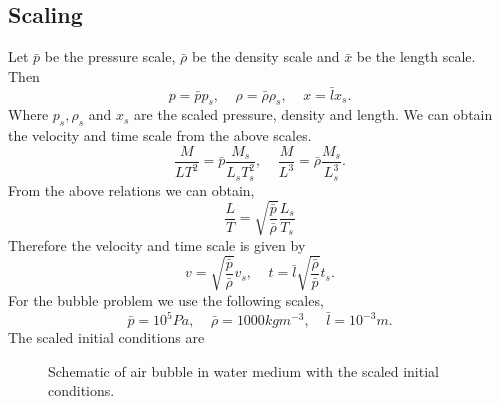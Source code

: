 \documentclass[a4paper]{article}
\begin{document}
\subsection*{Scaling}
Let $\bar{p}$ be the pressure scale, $\bar{\rho}$ be the density scale and $\bar{x}$ be the length scale. Then
\begin{equation}
    p = \bar{p}p_s, \;\;\;\; \rho = \bar{\rho} \rho_s, \;\;\;\; x = \bar{l}x_s. 
\end{equation}
Where $p_s, \rho_s$ and $x_s$ are the scaled pressure, density and length. We can obtain the velocity and time scale from the above scales.
\begin{equation}
    \frac{M}{LT^2} = \bar{p}\frac{M_s}{L_sT^2_s}, \;\;\;\; \frac{M}{L^3} = \bar{\rho}\frac{M_s}{L^3_s}.
\end{equation}
From the above relations we can obtain,
\begin{equation}
    \frac{L}{T} = \sqrt{\frac{\bar{p}}{\bar{\rho}}}\frac{L_s}{T_s}
\end{equation}
Therefore the velocity and time scale is given by
\begin{equation}
    v = \sqrt{\frac{\bar{p}}{\bar{\rho}}} v_s, \;\;\;\; t = \bar{l} \sqrt{\frac{\bar{\rho}}{\bar{p}}} t_s. 
\end{equation}
For the bubble problem we use the following scales,
\begin{equation}
    \bar{p} = 10^5Pa, \;\;\;\; \bar{\rho} = 1000 kgm^{-3}, \;\;\;\; \bar{l} = 10^{-3} m.
\end{equation}
The scaled initial conditions are
\begin{figure}[!h]
    \centering
    \caption{Schematic of air bubble in water medium with the scaled initial conditions.}
    \end{figure}
\end{document}
